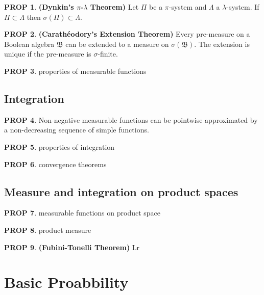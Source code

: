 \documentclass[hidelinks,11pt]{article}
\theoremstyle{definition}
\theoremstyle{dotless}
\newtheorem{prop}{PROP}[section]
\theoremstyle{remark}
\DeclareMathOperator{\1}{\mathbf{1}}
\begin{document}
\begin{prop}\textup{\textbf{(Dynkin's $\pi$-$\lambda$ Theorem)}} Let $\Pi$ be a $\pi$-system and $\Lambda$ a $\lambda$-system. If $\Pi\subset\Lambda$ then $\sigma(\Pi)\subset\Lambda$.
\end{prop}

\begin{prop}\textup{\textbf{(Carathéodory's Extension Theorem)}} Every pre-measure on a Boolean algebra $\mathfrak{B}$ can be extended to a measure on $\sigma(\mathfrak{B})$. The extension is unique if the pre-measure is $\sigma$-finite.
\end{prop}

\begin{prop}
properties of measurable functions
\end{prop}

\subsection{Integration}

\begin{prop}
Non-negative measurable functions can be pointwise approximated by a non-decreasing sequence of simple functions.
\end{prop}

\begin{prop}
properties of integration
\end{prop}

\begin{prop}
convergence theorems
\end{prop}

\subsection{Measure and integration on product spaces}

\begin{prop}
measurable functions on product space
\end{prop}

\begin{prop}
product measure
\end{prop}

\begin{prop}\textup{\textbf{(Fubini-Tonelli Theorem)}} Lr
\end{prop}

\newpage
\section{Basic Proabbility}
\end{document}
